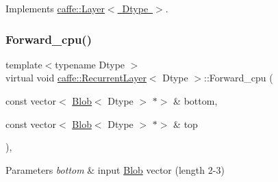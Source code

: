 Implements \mbox{\hyperlink{classcaffe_1_1_layer_a576ac6a60b1e99fe383831f52a6cea77}{caffe\+::\+Layer$<$ Dtype $>$}}.

\mbox{\label{classcaffe_1_1_recurrent_layer_a1dffda3073cd6f93a80c73b27c4dd0ba}} 
\subsubsection{\texorpdfstring{Forward\+\_\+cpu()}{Forward\_cpu()}\hspace{0.1cm}{\footnotesize\ttfamily [2/2]}}
{\footnotesize\ttfamily template$<$typename Dtype $>$ \\
virtual void \mbox{\hyperlink{classcaffe_1_1_recurrent_layer}{caffe\+::\+Recurrent\+Layer}}$<$ Dtype $>$\+::Forward\+\_\+cpu (\begin{DoxyParamCaption}\item[{const vector$<$ \mbox{\hyperlink{classcaffe_1_1_blob}{Blob}}$<$ Dtype $>$ $\ast$$>$ \&}]{bottom,  }\item[{const vector$<$ \mbox{\hyperlink{classcaffe_1_1_blob}{Blob}}$<$ Dtype $>$ $\ast$$>$ \&}]{top }\end{DoxyParamCaption})\hspace{0.3cm}{\ttfamily [protected]}, {\ttfamily [virtual]}}


\begin{DoxyParams}{Parameters}
{\em bottom} & input \mbox{\hyperlink{classcaffe_1_1_blob}{Blob}} vector (length 2-\/3)\\
\hline
\end{DoxyParams}

